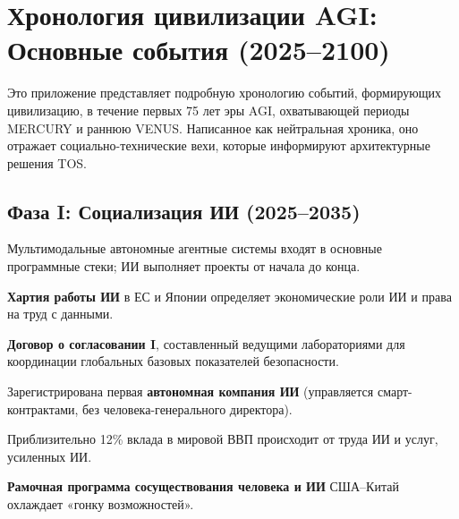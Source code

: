 \documentclass[11pt]{article}
\begin{document}
\newpage

\section{Хронология цивилизации AGI: Основные события (2025–2100)}
\label{appendix:timeline}

Это приложение представляет подробную хронологию событий, формирующих цивилизацию, в течение первых 75 лет эры AGI, охватывающей периоды MERCURY и раннюю VENUS. Написанное как нейтральная хроника, оно отражает социально-технические вехи, которые информируют архитектурные решения TOS.

\subsection{Фаза I: Социализация ИИ (2025–2035)}
\begin{description}[style=nextline,leftmargin=2cm]
  \item[2026] Мультимодальные автономные агентные системы входят в основные программные стеки; ИИ выполняет проекты от начала до конца.
  \item[2028] \textbf{Хартия работы ИИ} в ЕС и Японии определяет экономические роли ИИ и права на труд с данными.
  \item[2029] \textbf{Договор о согласовании I}, составленный ведущими лабораториями для координации глобальных базовых показателей безопасности.
  \item[2030] Зарегистрирована первая \textbf{автономная компания ИИ} (управляется смарт-контрактами, без человека-генерального директора).
  \item[2032] Приблизительно 12\% вклада в мировой ВВП происходит от труда ИИ и услуг, усиленных ИИ.
  \item[2034] \textbf{Рамочная программа сосуществования человека и ИИ} США–Китай охлаждает «гонку возможностей».
\end{description}
\end{document}
